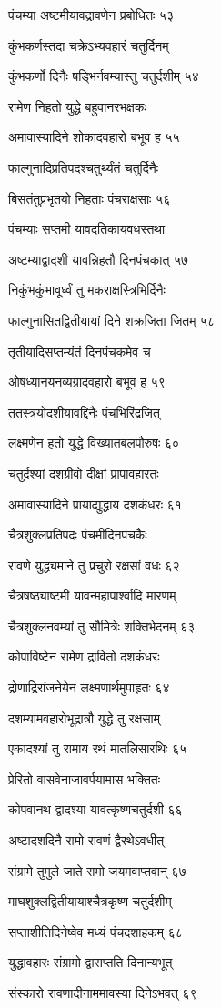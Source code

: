 पंचम्या अष्टमीयावद्रावणेन प्रबोधितः ५३

कुंभकर्णस्तदा चक्रेऽभ्यवहारं चतुर्दिनम्

कुंभकर्णो दिनैः षड्भिर्नवम्यास्तु चतुर्दशीम् ५४

रामेण निहतो युद्धे बहुवानरभक्षकः

अमावास्यादिने शोकादवहारो बभूव ह ५५

फाल्गुनादिप्रतिपदश्चतुर्थ्यंतं चतुर्दिनैः

बिसतंतुप्रभृतयो निहताः पंचराक्षसाः ५६

पंचम्याः सप्तमी यावदतिकायवधस्तथा

अष्टम्याद्वादशी यावन्निहतौ दिनपंचकात् ५७

निकुंभकुंभावूर्ध्वं तु मकराक्षस्त्रिभिर्दिनैः

फाल्गुनासितद्वितीयायां दिने शक्रजिता जितम् ५८

तृतीयादिसप्तम्यंतं दिनपंचकमेव च

ओषध्यानयनव्यग्रादवहारो बभूव ह ५९

ततस्त्रयोदशीयावद्दिनैः पंचभिरिंद्रजित्

लक्ष्मणेन हतो युद्धे विख्यातबलपौरुषः ६०

चतुर्दश्यां दशग्रीवो दीक्षां प्रापावहारतः

अमावास्यादिने प्रायाद्युद्धाय दशकंधरः ६१

चैत्रशुक्लप्रतिपदः पंचमीदिनपंचकैः

रावणे युद्ध्यमाने तु प्रचुरो रक्षसां वधः ६२

चैत्रषष्ठ्याष्टमी यावन्महापार्श्वादि मारणम्

चैत्रशुक्लनवम्यां तु सौमित्रेः शक्तिभेदनम् ६३

कोपाविष्टेन रामेण द्रावितो दशकंधरः

द्रोणाद्रिरांजनेयेन लक्ष्मणार्थमुपाहृतः ६४

दशम्यामवहारोभूद्रात्रौ युद्धे तु रक्षसाम्

एकादश्यां तु रामाय रथं मातलिसारथिः ६५

प्रेरितो वासवेनाजावर्पयामास भक्तितः

कोपवानथ द्वादश्या यावत्कृष्णचतुर्दशी ६६

अष्टादशदिनै रामो रावणं द्वैरथेऽवधीत्

संग्रामे तुमुले जाते रामो जयमवाप्तवान् ६७

माघशुक्लद्वितीयायाश्चैत्रकृष्ण चतुर्दशीम्

सप्ताशीतिदिनेष्वेव मध्यं पंचदशाहकम् ६८

युद्धावहारः संग्रामो द्वासप्तति दिनान्यभूत्

संस्कारो रावणादीनाममावस्या दिनेऽभवत् ६९

